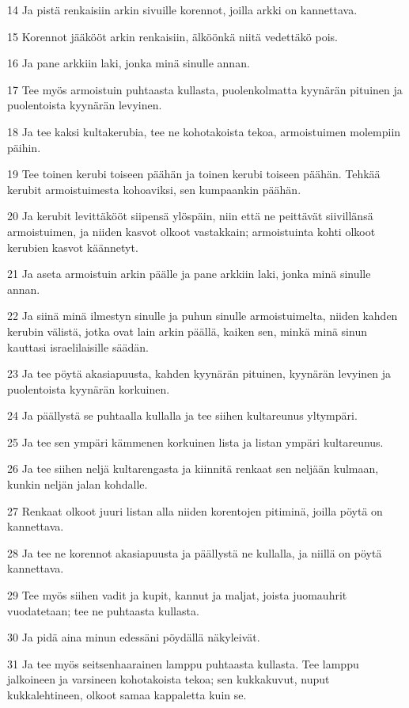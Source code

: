 \par 14 Ja pistä renkaisiin arkin sivuille korennot, joilla arkki on kannettava.
\par 15 Korennot jääkööt arkin renkaisiin, älköönkä niitä vedettäkö pois.
\par 16 Ja pane arkkiin laki, jonka minä sinulle annan.
\par 17 Tee myös armoistuin puhtaasta kullasta, puolenkolmatta kyynärän pituinen ja puolentoista kyynärän levyinen.
\par 18 Ja tee kaksi kultakerubia, tee ne kohotakoista tekoa, armoistuimen molempiin päihin.
\par 19 Tee toinen kerubi toiseen päähän ja toinen kerubi toiseen päähän. Tehkää kerubit armoistuimesta kohoaviksi, sen kumpaankin päähän.
\par 20 Ja kerubit levittäkööt siipensä ylöspäin, niin että ne peittävät siivillänsä armoistuimen, ja niiden kasvot olkoot vastakkain; armoistuinta kohti olkoot kerubien kasvot käännetyt.
\par 21 Ja aseta armoistuin arkin päälle ja pane arkkiin laki, jonka minä sinulle annan.
\par 22 Ja siinä minä ilmestyn sinulle ja puhun sinulle armoistuimelta, niiden kahden kerubin välistä, jotka ovat lain arkin päällä, kaiken sen, minkä minä sinun kauttasi israelilaisille säädän.
\par 23 Ja tee pöytä akasiapuusta, kahden kyynärän pituinen, kyynärän levyinen ja puolentoista kyynärän korkuinen.
\par 24 Ja päällystä se puhtaalla kullalla ja tee siihen kultareunus yltympäri.
\par 25 Ja tee sen ympäri kämmenen korkuinen lista ja listan ympäri kultareunus.
\par 26 Ja tee siihen neljä kultarengasta ja kiinnitä renkaat sen neljään kulmaan, kunkin neljän jalan kohdalle.
\par 27 Renkaat olkoot juuri listan alla niiden korentojen pitiminä, joilla pöytä on kannettava.
\par 28 Ja tee ne korennot akasiapuusta ja päällystä ne kullalla, ja niillä on pöytä kannettava.
\par 29 Tee myös siihen vadit ja kupit, kannut ja maljat, joista juomauhrit vuodatetaan; tee ne puhtaasta kullasta.
\par 30 Ja pidä aina minun edessäni pöydällä näkyleivät.
\par 31 Ja tee myös seitsenhaarainen lamppu puhtaasta kullasta. Tee lamppu jalkoineen ja varsineen kohotakoista tekoa; sen kukkakuvut, nuput kukkalehtineen, olkoot samaa kappaletta kuin se.
